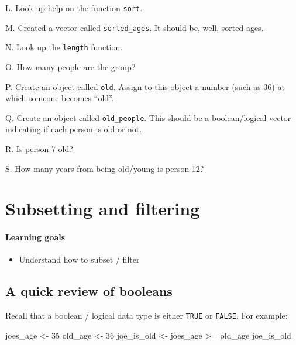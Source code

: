 \documentclass[
]{book}
\newenvironment{Shaded}{\begin{snugshade}}{\end{snugshade}}
\newcommand{\DecValTok}[1]{\textcolor[rgb]{0.00,0.00,0.81}{#1}}
\newcommand{\NormalTok}[1]{#1}
\newcommand{\OtherTok}[1]{\textcolor[rgb]{0.56,0.35,0.01}{#1}}
\newcommand{\SpecialCharTok}[1]{\textcolor[rgb]{0.00,0.00,0.00}{#1}}
\providecommand{\tightlist}{%
  \setlength{\itemsep}{0pt}\setlength{\parskip}{0pt}}
\begin{document}
L. Look up help on the function \texttt{sort}.

M. Created a vector called \texttt{sorted\_ages}. It should be, well, sorted ages.

N. Look up the \texttt{length} function.

O. How many people are the group?

P. Create an object called \texttt{old}. Assign to this object a number (such as 36) at which someone becomes ``old''.

Q. Create an object called \texttt{old\_people}. This should be a boolean/logical vector indicating if each person is old or not.

R. Is person 7 old?

S. How many years from being old/young is person 12?

\hypertarget{subsetting}{%
\chapter{Subsetting and filtering}\label{subsetting}}

\hypertarget{learning-goals-5}{%
\subsubsection*{Learning goals}\label{learning-goals-5}}

\begin{itemize}
\tightlist
\item
  Understand how to subset / filter
\end{itemize}

\hypertarget{a-quick-review-of-booleans}{%
\section*{A quick review of booleans}\label{a-quick-review-of-booleans}}

Recall that a boolean / logical data type is either \texttt{TRUE} or \texttt{FALSE}. For example:

\begin{Shaded}
\begin{Highlighting}[]
\NormalTok{joes\_age }\OtherTok{\textless{}{-}} \DecValTok{35}
\NormalTok{old\_age }\OtherTok{\textless{}{-}} \DecValTok{36}
\NormalTok{joe\_is\_old }\OtherTok{\textless{}{-}}\NormalTok{ joes\_age }\SpecialCharTok{\textgreater{}=}\NormalTok{ old\_age}
\NormalTok{joe\_is\_old}
\end{Highlighting}
\end{Shaded}
\end{document}
